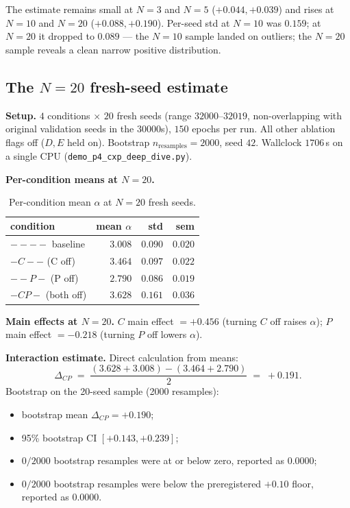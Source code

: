The estimate remains small at $N\!=\!3$ and $N\!=\!5$
($+0.044, +0.039$) and rises at $N\!=\!10$ and $N\!=\!20$
($+0.088, +0.190$). Per-seed std at $N\!=\!10$ was $0.159$; at
$N\!=\!20$ it dropped to $0.089$ — the $N\!=\!10$ sample landed on
outliers; the $N\!=\!20$ sample reveals a clean narrow positive
distribution.

\subsection{The \texorpdfstring{$N\!=\!20$}{N=20} fresh-seed estimate}

\textbf{Setup.} $4$ conditions $\times$ $20$ fresh seeds (range
$32000$--$32019$, non-overlapping with original validation seeds in
the $30000$s), $150$ epochs per run. All other ablation flags off
($D, E$ held on). Bootstrap $n_{\mathrm{resamples}}\!=\!2000$,
seed $42$. Wallclock $1706$\,s on a single CPU
(\texttt{demo\_p4\_cxp\_deep\_dive.py}).

\textbf{Per-condition means at \texorpdfstring{$N\!=\!20$}{N=20}.}

\begin{table}[ht]
\centering
\small
\caption{Per-condition mean $\alpha$ at $N=20$ fresh seeds.}
\label{tab:cxp_means}
\begin{tabular}{l r r r}
\toprule
condition & mean $\alpha$ & std & sem \\
\midrule
$----$ baseline    & $3.008$ & $0.090$ & $0.020$ \\
$-C--$ (C off)     & $3.464$ & $0.097$ & $0.022$ \\
$--P-$ (P off)     & $2.790$ & $0.086$ & $0.019$ \\
$-CP-$ (both off)  & $3.628$ & $0.161$ & $0.036$ \\
\bottomrule
\end{tabular}
\end{table}

\textbf{Main effects at \texorpdfstring{$N\!=\!20$}{N=20}.}
$C$ main effect $= +0.456$ (turning $C$ off raises $\alpha$);
$P$ main effect $= -0.218$ (turning $P$ off lowers $\alpha$).

\textbf{Interaction estimate.} Direct calculation from means:
\[
\Delta_{CP} \;=\; \frac{(3.628 + 3.008) - (3.464 + 2.790)}{2}
            \;=\; +0.191.
\]
Bootstrap on the 20-seed sample (2000 resamples):
\begin{itemize}\itemsep=1pt
\item bootstrap mean $\Delta_{CP} = +0.190$;
\item 95\% bootstrap CI $[+0.143, +0.239]$;
\item $0/2000$ bootstrap resamples were at or below zero, reported as
      $0.0000$;
\item $0/2000$ bootstrap resamples were below the preregistered
      $+0.10$ floor, reported as $0.0000$.
\end{itemize}

